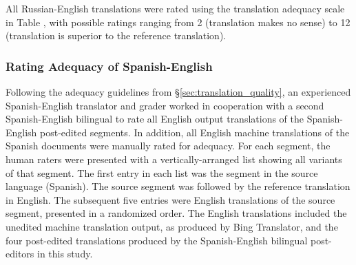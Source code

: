 All Russian-English translations were rated using the translation adequacy scale in Table , with possible ratings ranging from  2 (translation makes no sense) to 12 (translation is superior to the reference translation).




\subsubsection{Rating Adequacy of Spanish-English}

Following the adequacy guidelines from \S\ref{sec:translation_quality}, 
%
an experienced Spanish-English translator and grader worked in cooperation with a second Spanish-English bilingual to rate all English output translations of the Spanish-English post-edited segments.
%
In addition, all English machine translations of the Spanish documents were manually rated for adequacy.
%
For each segment, the human raters were presented with a vertically-arranged list showing all variants of that segment.
%
The first entry in each list was the segment in the source language (Spanish).
%
The source segment was followed by the reference translation in English.
%
The subsequent five entries were English translations of the source segment, presented in a randomized order.
%
The English translations included the unedited machine translation output, as produced by Bing Translator,
%
and the four post-edited translations produced by the Spanish-English bilingual post-editors in this study.

